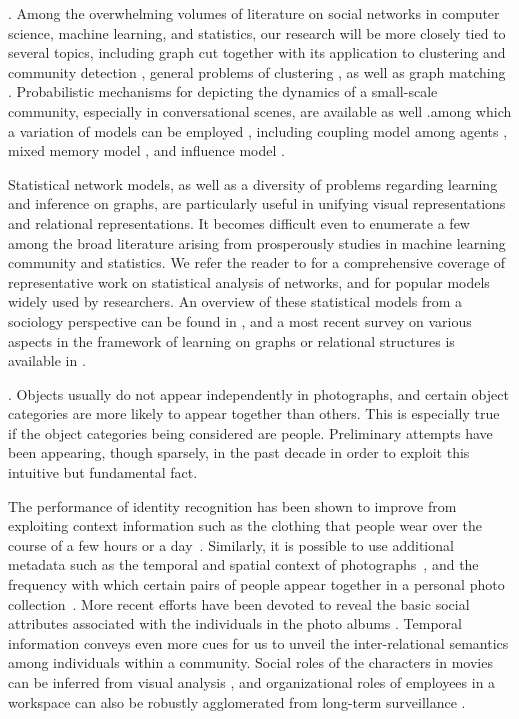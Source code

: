 . Among the overwhelming volumes of literature on social networks in computer science, machine learning, and statistics, our research will be more closely tied to several topics, including graph cut \cite{Boykov:segmentation} together with its application to clustering and community detection \cite{Ng:spectral,Filippone:clustering}, general problems of clustering \cite{Xu:clustering}, as well as graph matching \cite{West:Graph,Caetano:graph}. Probabilistic mechanisms for depicting the dynamics of a small-scale community, especially in conversational scenes, are available as well \cite{Basu:meeting,Dong}.among which a variation of models can be employed , including coupling model among agents \cite{Brand:CHMM}, mixed memory model \cite{Choudhury:MHMM}, and influence model \cite{Pan:influence}.

Statistical network models, as well as a diversity of problems regarding learning and inference on graphs, are particularly useful in unifying visual representations and relational representations. It becomes difficult even to enumerate a few among the broad literature arising from prosperously studies in machine learning community and statistics.  We refer the reader to \cite{Kolacyzk} for a comprehensive coverage of representative work on statistical analysis of networks, and \cite{Goldenberg} for popular models widely used by researchers. An overview of these statistical models from a sociology perspective can be found in \cite{Snijders}, and a most recent survey on various aspects in the framework of learning on graphs or relational structures is available in \cite{Rossi}.


. Objects usually do not appear independently in photographs, and certain object categories are more likely to appear together than others. This is especially true if the object categories being considered are people. Preliminary attempts have been appearing, though sparsely, in the past decade in order to exploit this intuitive but fundamental fact. 

The performance of identity recognition has been shown to improve from exploiting context information such as the clothing that people wear over the course of a few hours or a day~\cite{anguelov2007cir, zhang2003aah,  song2006cah, sivic2006fpr}. Similarly, it is possible to use additional metadata such as the temporal and spatial context of photographs~\cite{naaman2005lcr, zhao2006apa}, and the frequency with which certain pairs of people appear together in a personal photo collection~\cite{anguelov2007cir}. More recent efforts have been devoted to reveal the basic social attributes associated with the individuals in the photo albums \cite{Gallagher,Wang2010}. Temporal information conveys even more cues for us to unveil the inter-relational semantics among individuals within a community. Social roles of the characters in movies can be inferred from visual analysis \cite{Ding2010,Ding2011}, and organizational roles of employees in a workspace can also be robustly agglomerated from long-term surveillance \cite{Yu2009,Zhang2011}.

